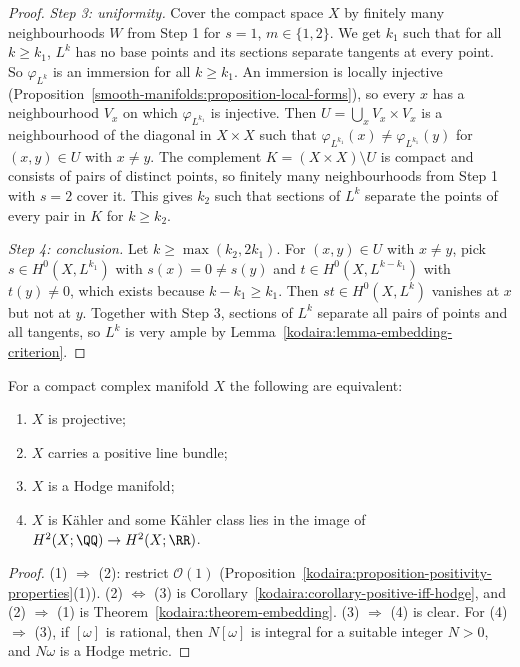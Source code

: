 \begin{proof}
\emph{Step 3: uniformity.} Cover the compact space $X$ by finitely many neighbourhoods $W$ from Step 1 for $s = 1$, $m \in \{1, 2\}$. We get $k_1$
such that for all $k \geq k_1$, $L^k$ has no base points and its sections separate tangents at every point. So $\varphi_{L^k}$ is an immersion for all
$k \geq k_1$. An immersion is locally injective (Proposition~\ref{smooth-manifolds:proposition-local-forms}), so every $x$ has a neighbourhood $V_x$ on
which $\varphi_{L^{k_1}}$ is injective. Then $U = \bigcup_xV_x \times V_x$ is a neighbourhood of the diagonal in $X \times X$ such that
$\varphi_{L^{k_1}}(x) \neq \varphi_{L^{k_1}}(y)$ for $(x, y) \in U$ with $x \neq y$. The complement $K = (X \times X) \setminus U$ is compact and
consists of pairs of distinct points, so finitely many neighbourhoods from Step 1 with $s = 2$ cover it. This gives $k_2$ such that sections of $L^k$
separate the points of every pair in $K$ for $k \geq k_2$.

\emph{Step 4: conclusion.} Let $k \geq \max(k_2, 2k_1)$. For $(x, y) \in U$ with $x \neq y$, pick $s \in H^0(X, L^{k_1})$ with $s(x) = 0 \neq s(y)$ and
$t \in H^0(X, L^{k - k_1})$ with $t(y) \neq 0$, which exists because $k - k_1 \geq k_1$. Then $st \in H^0(X, L^k)$ vanishes at $x$ but not at $y$.
Together with Step 3, sections of $L^k$ separate all pairs of points and all tangents, so $L^k$ is very ample by
Lemma~\ref{kodaira:lemma-embedding-criterion}.
\end{proof}

\begin{corollary}\label{kodaira:corollary-projective-criterion}
For a compact complex manifold $X$ the following are equivalent:
\begin{enumerate}
\item $X$ is projective;
\item $X$ carries a positive line bundle;
\item $X$ is a Hodge manifold;
\item $X$ is K\"ahler and some K\"ahler class lies in the image of $H^2(X; \QQ) \to H^2(X; \RR)$.
\end{enumerate}
\end{corollary}

\begin{proof}
(1) $\Rightarrow$ (2): restrict $\mathcal{O}(1)$ (Proposition~\ref{kodaira:proposition-positivity-properties}(1)). (2) $\Leftrightarrow$ (3) is
Corollary~\ref{kodaira:corollary-positive-iff-hodge}, and (2) $\Rightarrow$ (1) is Theorem~\ref{kodaira:theorem-embedding}. (3) $\Rightarrow$ (4) is
clear. For (4) $\Rightarrow$ (3), if $[\omega]$ is rational, then $N[\omega]$ is integral for a suitable integer $N > 0$, and $N\omega$ is a Hodge metric.
\end{proof}

